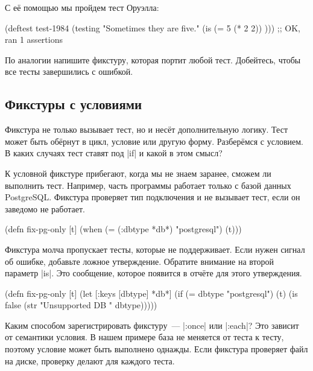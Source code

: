 
\noindent
С её помощью мы пройдем тест Оруэлла:

\begin{english}
  \begin{clojure}
(deftest test-1984
  (testing "Sometimes they are five."
    (is (= 5 (* 2 2)) )))
;; OK, ran 1 assertions
  \end{clojure}
\end{english}

По аналогии напишите фикстуру, которая портит любой тест. Добейтесь, чтобы все
тесты завершились с ошибкой.

\subsection{Фикстуры с условиями}


Фикстура не только вызывает тест, но и несёт дополнительную логику. Тест может
быть обёрнут в цикл, условие или другую форму. Разберёмся с условием. В
каких случаях тест ставят под \spverb|if| и какой в этом смысл?

К условной фикстуре прибегают, когда мы не знаем заранее, сможем ли выполнить
тест. Например, часть программы работает только с базой данных
PostgreSQL. Фикстура проверяет тип подключения и не вызывает тест, если он
заведомо не работает.

\begin{english}
  \begin{clojure}
(defn fix-pg-only [t]
  (when (= (:dbtype *db*) "postgresql")
    (t)))
  \end{clojure}
\end{english}

Фикстура молча пропускает тесты, которые не поддерживает. Если нужен сигнал об
ошибке, добавьте ложное утверждение. Обратите внимание на второй параметр
\spverb|is|. Это сообщение, которое появится в отчёте для этого утверждения.

\begin{english}
  \begin{clojure}
(defn fix-pg-only [t]
  (let [{:keys [dbtype]} *db*]
    (if (= dbtype "postgresql")
      (t)
      (is false (str "Unsupported DB " dbtype)))))
  \end{clojure}
\end{english}

Каким способом зарегистрировать фикстуру~--- \spverb|:once| или \spverb|:each|?
Это зависит от семантики условия. В нашем примере база не меняется от теста к
тесту, поэтому условие может быть выполнено однажды. Если фикстура проверяет
файл на диске, проверку делают для каждого теста.

